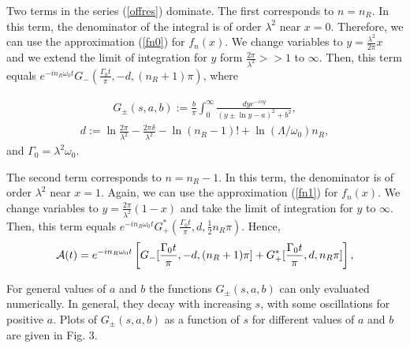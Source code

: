 \documentclass[12pt]{article}
\numberwithin{equation}{section}
\begin{document}
Two terms in the series (\ref{offres}) dominate. The first corresponds to $n = n_R$. In this term, the denominator of the integral is of order $\lambda^2$ near $x = 0$. Therefore, we can use the approximation (\ref{fn0}) for $f_n(x)$. We change variables to $y = \frac{\lambda^2}{2\pi}x$ and we extend the limit of integration for $y$ form $\frac{2\pi}{\lambda^2}>> 1$ to $\infty$. Then, this term equals $e^{-in_R\omega_0 t} G_-(\frac{\Gamma_0t}{\pi}, -d, (n_R+1)\pi)$, where

\begin{eqnarray}
G_{\pm}(s, a, b) :=  \frac{b}{\pi}  \int_0^{\infty} \frac{dy e^{- i    s y}}{(y \pm \ln y - a)^2  + b^2 },  \label{gsab}
\end{eqnarray}
\begin{eqnarray}
 d := \ln \frac{2 \pi}{\lambda^2} - \frac{2\pi\delta}{\lambda^2} - \ln (n_R-1)!  +   \ln(\Lambda/\omega_0) n_R,
  \end{eqnarray}
  and $\Gamma_0 =   \lambda^2 \omega_0$.

 The second term corresponds to $n = n_R - 1 $. In this term, the denominator is of order $\lambda^2$ near $x = 1$. Again, we can use the approximation (\ref{fn1}) for $f_n(x)$. We change variables to $y = \frac{2\pi}{\lambda^2}(1-x)$ and take the limit of integration for $y$ to $\infty$. Then, this term equals $e^{-in_R\omega_0 t} G_+^*(\frac{\Gamma_0t}{\pi}, d, \frac{1}{2}n_R\pi)$. Hence,
 \begin{eqnarray}
{\cal A} (t) =  e^{-in_R \omega_0 t} \left[ G_-[\frac{\Gamma_0t}{\pi}, -d,  (n_R+1)\pi ] + G^*_+[\frac{\Gamma_0t}{\pi}, d,  n_R \pi ]   \right], \label{atres}
\end{eqnarray}




For general values of $a$ and $b$ the functions $G_{\pm}(s, a,b)$ can only evaluated numerically. In general, they decay with increasing $s$, with some oscillations for positive $a$.  Plots of $G_{\pm}(s, a, b)$ as a function of $s$ for different values of $a$ and $b$ are given in Fig. 3.
\end{document}
